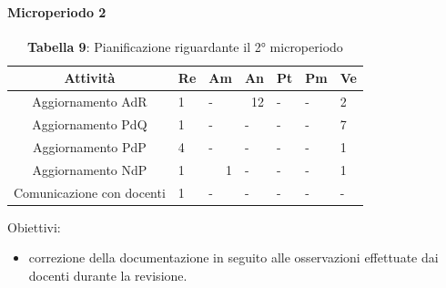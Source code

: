 \paragraph{Microperiodo 2}
\begin{table}[H]
	\centering
	\renewcommand{\arraystretch}{1.5}
	\begin{tabular}{|c|p{10mm}|p{10mm}|p{10mm}|p{10mm}|p{10mm}|p{10mm}|}
		\hline
		\rowcolor{lighter-grayer}
		\textbf{Attività}                         & \textbf{Re} & \textbf{Am} & \textbf{An} & \textbf{Pt} & \textbf{Pm} & \textbf{Ve} \\ \hline
		
		Aggiornamento AdR                       & 1                                & -                                & \multicolumn{1}{r|}{12}          & -                                & -                                & 2                                \\ \hline
		Aggiornamento PdQ                       & 1                                & -                                & -                                & -                                & -                                & 7                                \\ \hline
		Aggiornamento PdP                       & 4                                & -                                & -                                & -                                & -                                & 1                                \\ \hline
		Aggiornamento NdP                       & 1                                & \multicolumn{1}{r|}{1}           & -                                & -                                & -                                & 1                                \\ \hline
		Comunicazione con docenti               & 1                                & -                                & -                                & -                                & -                                & \multicolumn{1}{l|}{-}           \\ \hline
		
	\end{tabular}
	\caption*{\textbf{Tabella 9}: Pianificazione riguardante il 2° microperiodo\\}
\end{table}

Obiettivi:
\begin{itemize}
	\item correzione della documentazione in seguito alle osservazioni effettuate dai docenti durante la revisione. 
\end{itemize}


